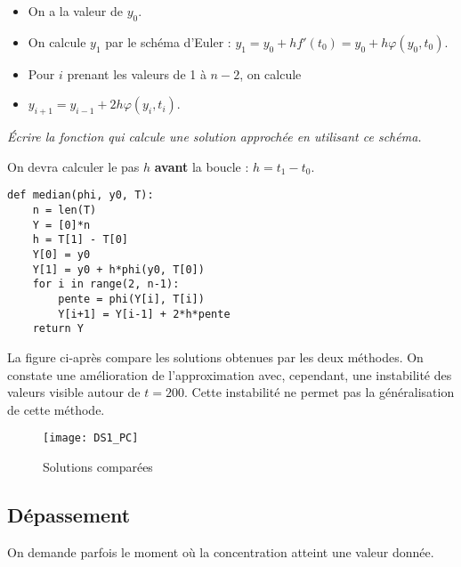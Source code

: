 \begin{itemize}
\item On a la valeur de $y_0$.
\item On calcule $y_1$ par le schéma d'Euler : $y_1 = y_0 + hf'(t_0) = y_0 + h\varphi(y_0, t_0)$.
\item Pour $i$ prenant les valeurs de 1 à $n-2$, on calcule 
\item $y_{i+1} = y_{i-1} + 2h\varphi(y_i, t_i)$.
\end{itemize}
\begin{Exercise}\it
Écrire la fonction  qui calcule une solution approchée en utilisant ce schéma.

On devra calculer le pas $h$ {\bf avant} la boucle  : $h = t_1-t_0$.
\end{Exercise}
\begin{Answer}
\begin{lstlisting}
def median(phi, y0, T):
    n = len(T)
    Y = [0]*n
    h = T[1] - T[0]
    Y[0] = y0 
    Y[1] = y0 + h*phi(y0, T[0])
    for i in range(2, n-1): 
        pente = phi(Y[i], T[i])  
        Y[i+1] = Y[i-1] + 2*h*pente
    return Y
\end{lstlisting}
\end{Answer}

La figure ci-après compare les solutions obtenues par les deux méthodes. On constate une amélioration de l'approximation avec, cependant, une instabilité des valeurs visible autour de $t=200$. Cette instabilité ne permet pas la généralisation de cette méthode.
\begin{figure}[ht]
\begin{center}
\texttt{[image: DS1\_PC]}
\caption{Solutions comparées}
\end{center}
\end{figure}
\subsection{Dépassement} 
On demande parfois le moment où la concentration atteint une valeur donnée.


